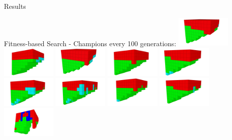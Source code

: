 \documentclass{beamer}
\begin{document}
\begin{frame}[allowframebreaks]{Results}
\begin{minipage}{\textwidth}
\begin{block}{Fitness-based Search - Champions every 100 generations:}
\includegraphics[width=0.2\textwidth]{../Figures/Robots/f_4_g_100.jpg}
\includegraphics[width=0.2\textwidth]{../Figures/Robots/f_4_g_200.jpg}
\includegraphics[width=0.2\textwidth]{../Figures/Robots/f_4_g_300.jpg}
\includegraphics[width=0.2\textwidth]{../Figures/Robots/f_4_g_400.jpg}
\includegraphics[width=0.2\textwidth]{../Figures/Robots/f_4_g_500.jpg}\\
\includegraphics[width=0.2\textwidth]{../Figures/Robots/f_4_g_600.jpg}
\includegraphics[width=0.2\textwidth]{../Figures/Robots/f_4_g_700.jpg}
\includegraphics[width=0.2\textwidth]{../Figures/Robots/f_4_g_800.jpg}
\includegraphics[width=0.2\textwidth]{../Figures/Robots/f_4_g_900.jpg}
\includegraphics[width=0.2\textwidth]{../Figures/Robots/f_4_g_1000.jpg}
\end{block}
\end{minipage}


\end{frame}
\end{document}

